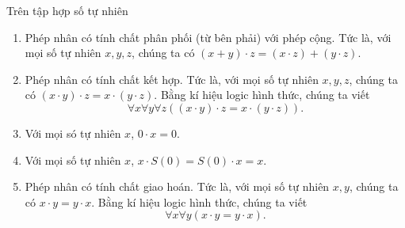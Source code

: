 \begin{theorem}\label{theorem:property-of-natural-numbers-multiplication}
	Trên tập hợp số tự nhiên
	\begin{enumerate}[label={(\roman*)}]
		\item Phép nhân có tính chất phân phối (từ bên phải) với phép cộng. Tức là, với mọi số tự nhiên $x, y, z$, chúng ta có $(x + y)\cdot z = (x\cdot z) + (y\cdot z)$.
		\item Phép nhân có tính chất kết hợp. Tức là, với mọi số tự nhiên $x, y, z$, chúng ta có $(x \cdot y) \cdot z = x \cdot (y \cdot z)$. Bằng kí hiệu logic hình thức, chúng ta viết
		      \[
			      \forall x\forall y\forall z \left( (x \cdot y) \cdot z = x \cdot (y \cdot z) \right).
		      \]
		\item Với mọi só tự nhiên $x$, $0\cdot x = 0$.
		\item Với mọi số tự nhiên $x$, $x\cdot S(0) = S(0) \cdot x = x$.
		\item Phép nhân có tính chất giao hoán.  Tức là, với mọi số tự nhiên $x, y$, chúng ta có $x \cdot y = y \cdot x$. Bằng kí hiệu logic hình thức, chúng ta viết
		      \[
			      \forall x\forall y \left( x \cdot y = y \cdot x \right).
		      \]
	\end{enumerate}
\end{theorem}

